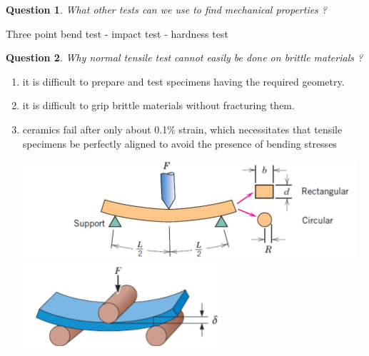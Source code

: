 \documentclass[13]{article}
\newtheorem{exer}{Question}
\begin{document}
\begin{exer}
	What other tests can we use to find mechanical properties ?
\end{exer}
Three point bend test - impact test - hardness test
\begin{exer}
Why normal tensile test cannot easily be done on brittle materials ? 
\end{exer}
\begin{enumerate}
\item it is difficult to prepare and test specimens having the required geometry.
\item it is difficult to grip brittle materials without fracturing them.
\item ceramics fail after only about 0.1\% strain, which necessitates that tensile
specimens be perfectly aligned to avoid the presence of bending stresses
\begin{center}
\includegraphics[scale=0.5]{figures/28.png} \includegraphics[scale=0.5]{figures/29.png}
\end{center}
\end{enumerate}
\end{document}
